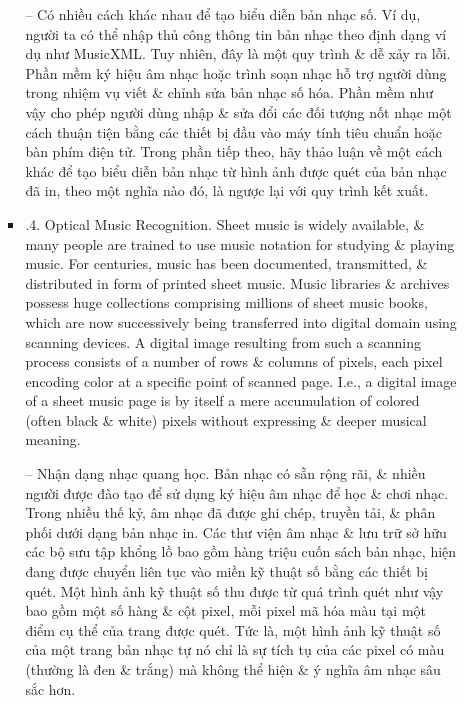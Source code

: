 \documentclass{article}
\begin{document}
\begin{itemize}
\begin{itemize}
\begin{itemize}
			-- Có nhiều cách khác nhau để tạo biểu diễn bản nhạc số. Ví dụ, người ta có thể nhập thủ công thông tin bản nhạc theo định dạng ví dụ như MusicXML. Tuy nhiên, đây là một quy trình \& dễ xảy ra lỗi. Phần mềm ký hiệu âm nhạc hoặc trình soạn nhạc hỗ trợ người dùng trong nhiệm vụ viết \& chỉnh sửa bản nhạc số hóa. Phần mềm như vậy cho phép người dùng nhập \& sửa đổi các đối tượng nốt nhạc một cách thuận tiện bằng các thiết bị đầu vào máy tính tiêu chuẩn hoặc bàn phím điện tử. Trong phần tiếp theo, hãy thảo luận về một cách khác để tạo biểu diễn bản nhạc từ hình ảnh được quét của bản nhạc đã in, theo một nghĩa nào đó, là ngược lại với quy trình kết xuất.
			\item {.4. Optical Music Recognition.} Sheet music is widely available, \& many people are trained to use music notation for studying \& playing music. For centuries, music has been documented, transmitted, \& distributed in form of printed sheet music. Music libraries \& archives possess huge collections comprising millions of sheet music books, which are now successively being transferred into digital domain using scanning devices. A digital image resulting from such a scanning process consists of a number of rows \& columns of pixels, each pixel encoding color at a specific point of scanned page. I.e., a digital image of a sheet music page is by itself a mere accumulation of colored (often black \& white) pixels without expressing \& deeper musical meaning.
			
			-- {\sf Nhận dạng nhạc quang học.} Bản nhạc có sẵn rộng rãi, \& nhiều người được đào tạo để sử dụng ký hiệu âm nhạc để học \& chơi nhạc. Trong nhiều thế kỷ, âm nhạc đã được ghi chép, truyền tải, \& phân phối dưới dạng bản nhạc in. Các thư viện âm nhạc \& lưu trữ sở hữu các bộ sưu tập khổng lồ bao gồm hàng triệu cuốn sách bản nhạc, hiện đang được chuyển liên tục vào miền kỹ thuật số bằng các thiết bị quét. Một hình ảnh kỹ thuật số thu được từ quá trình quét như vậy bao gồm một số hàng \& cột pixel, mỗi pixel mã hóa màu tại một điểm cụ thể của trang được quét. Tức là, một hình ảnh kỹ thuật số của một trang bản nhạc tự nó chỉ là sự tích tụ của các pixel có màu (thường là đen \& trắng) mà không thể hiện \& ý nghĩa âm nhạc sâu sắc hơn.
			

\end{itemize}
\end{itemize}
\end{itemize}
\end{document}

